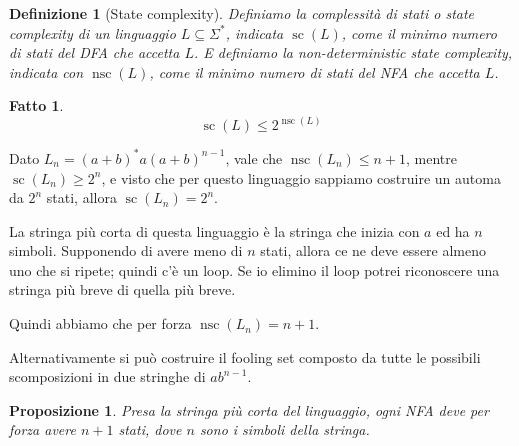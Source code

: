 \documentclass[12pt]{article}
\newtheorem{proposizione}{Proposizione}
\newtheorem{fatto}{Fatto}
\newtheorem{definizione}{Definizione}
\begin{document}
\begin{definizione}[State complexity]
	Definiamo la complessità di stati o state complexity di un linguaggio $L \subseteq \Sigma^*$, indicata $\operatorname{sc}(L)$, come il minimo numero di stati del DFA che accetta $L$.
	E definiamo la non-deterministic state complexity, indicata con $\operatorname{nsc}(L)$, come il minimo numero di stati del NFA che accetta $L$.
\end{definizione}
\begin{fatto}
	$$\operatorname{sc}(L) \leq 2^{\operatorname{nsc}(L)}$$
\end{fatto}
\begin{tcolorbox}
	Dato $L_n = (a + b)^* a (a + b)^{n - 1}$, vale che $\operatorname{nsc}(L_n) \leq n + 1$, mentre $\operatorname{sc}(L_n) \geq 2^n$, e visto che per questo linguaggio sappiamo costruire un automa da $2^n$ stati, allora
	$\operatorname{sc}(L_n) = 2^n$.

	La stringa più corta di questa linguaggio è la stringa che inizia con $a$ ed ha $n$ simboli.
	Supponendo di avere meno di $n$ stati, allora ce ne deve essere almeno uno che si ripete; quindi c'è un loop.
	Se io elimino il loop potrei riconoscere una stringa più breve di quella più breve.

	Quindi abbiamo che per forza $\operatorname{nsc}(L_n) = n + 1$.

	Alternativamente si può costruire il fooling set composto da tutte le possibili scomposizioni in due stringhe di $ab^{n - 1}$.
\end{tcolorbox}
\begin{proposizione}
	Presa la stringa più corta del linguaggio, ogni NFA deve per forza avere $n + 1$ stati, dove $n$ sono i simboli della stringa.
\end{proposizione}
\end{document}
